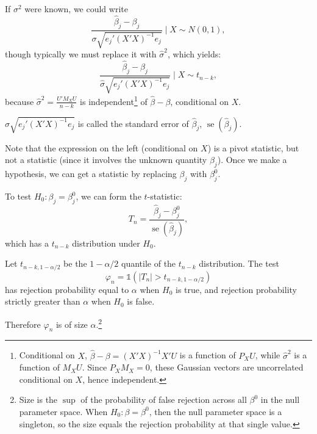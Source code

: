 \begin{proposition}
	If $\sigma^2$ were known, we could write \[
			\frac{\hat{\beta}_j - \beta_j}{\sigma \sqrt{e_j' (X'X)^{-1} e_j}} \mid X \sim N(0,1)
		,\] though typically we must replace it with $\hat{\sigma}^2$, which yields: \[
			\frac{\hat{\beta}_j - \beta_j}{\hat{\sigma} \sqrt{e_j' (X'X)^{-1} e_j}} \mid X \sim t_{n-k}
		,\] because $\hat{\sigma}^2 = \frac{U' M_X U}{n-k}$ is independent\footnote{Conditional on $X$, $\hat{\beta}-\beta = (X'X)^{-1}X'U$ is a function of $P_XU$, while $\hat{\sigma}^2$ is a function of $M_XU$. Since $P_XM_X = 0$, these Gaussian vectors are uncorrelated conditional on $X$, hence independent.} of $\hat{\beta} - \beta$, conditional on $X$.
		
		$\hat{\sigma} \sqrt{e_j' (X'X)^{-1} e_j}$ is called the standard error of $\hat{\beta}_j$, $\operatorname{se}(\hat{\beta}_j)$.
	\end{proposition}

\begin{remark}	Note that the expression on the left (conditional on $X$) is a pivot statistic, but not a statistic (since it involves the unknown quantity $\beta_j$). Once we make a hypothesis, we can get a statistic by replacing $\beta_j$ with $\beta_j^{0}$.
\end{remark}
\begin{remark}	To test $H_0: \beta_j = \beta_j^0$, we can form the $t$-statistic: \[
		T_n = \frac{\hat{\beta}_j - \beta_j^0}{\operatorname{se}(\hat{\beta}_j)}
	,\] which has a $t_{n-k}$ distribution under $H_0$.
	
	Let $t_{n-k,1-\alpha/2}$ be the $1 - \alpha/2$ quantile of the $t_{n-k}$ distribution. The test \[
		\varphi_n = \mathds{1}\left( |T_n| > t_{n-k,1-\alpha/2} \right)
	\] has rejection probability equal to $\alpha$ when $H_0$ is true, and rejection probability strictly greater than $\alpha$ when $H_0$ is false.
	
		Therefore $\varphi_n$ is of size $\alpha$.\footnote{Size is the $\sup$ of the probability of false rejection across all $\beta^{0}$ in the null parameter space. When $H_0: \beta = \beta^{0}$, then the null parameter space is a singleton, so the size equals the rejection probability at that single value.}
	\end{remark}

